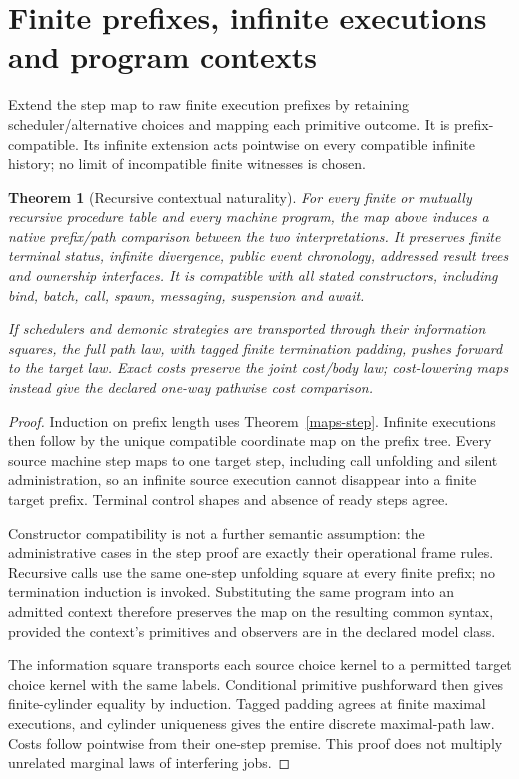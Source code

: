 \documentclass[11pt]{article}
\newtheorem{theorem}{Theorem}\newtheorem{definition}{Definition}\newtheorem{proposition}{Proposition}
\begin{document}
\section{Finite prefixes, infinite executions and program contexts}
Extend the step map to raw finite execution prefixes by retaining scheduler/alternative choices and mapping each primitive outcome. It is prefix-compatible. Its infinite extension acts pointwise on every compatible infinite history; no limit of incompatible finite witnesses is chosen.

\begin{theorem}[Recursive contextual naturality]\label{maps-contexts}
For every finite or mutually recursive procedure table and every machine program, the map above induces a native prefix/path comparison between the two interpretations. It preserves finite terminal status, infinite divergence, public event chronology, addressed result trees and ownership interfaces. It is compatible with all stated constructors, including bind, batch, call, spawn, messaging, suspension and await.

If schedulers and demonic strategies are transported through their information squares, the full path law, with tagged finite termination padding, pushes forward to the target law. Exact costs preserve the joint cost/body law; cost-lowering maps instead give the declared one-way pathwise cost comparison.
\end{theorem}
\begin{proof}
Induction on prefix length uses Theorem~\ref{maps-step}. Infinite executions then follow by the unique compatible coordinate map on the prefix tree. Every source machine step maps to one target step, including call unfolding and silent administration, so an infinite source execution cannot disappear into a finite target prefix. Terminal control shapes and absence of ready steps agree.

Constructor compatibility is not a further semantic assumption: the administrative cases in the step proof are exactly their operational frame rules. Recursive calls use the same one-step unfolding square at every finite prefix; no termination induction is invoked. Substituting the same program into an admitted context therefore preserves the map on the resulting common syntax, provided the context's primitives and observers are in the declared model class.

The information square transports each source choice kernel to a permitted target choice kernel with the same labels. Conditional primitive pushforward then gives finite-cylinder equality by induction. Tagged padding agrees at finite maximal executions, and cylinder uniqueness gives the entire discrete maximal-path law. Costs follow pointwise from their one-step premise. This proof does not multiply unrelated marginal laws of interfering jobs.
\end{proof}
\end{document}
